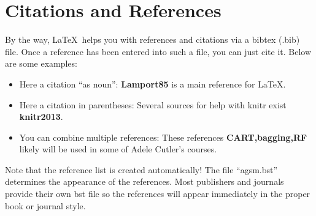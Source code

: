 \documentclass[12pt]{article}\usepackage[]{graphicx}\usepackage[]{xcolor}
\begin{document}
\section{Citations and References}

By the way, \LaTeX\ helps you with references and citations via
a bibtex (.bib) file. Once a reference has been entered into such a file,
you can just cite it. Below are some examples:

\begin{itemize}
\item Here a citation ``as noun'':
\textbf{Lamport85} is a main reference for \LaTeX.

\item Here a citation in parentheses:
Several sources for help with knitr exist \textbf{knitr2013}.

\item You can combine multiple references: These references
\textbf{CART,bagging,RF} likely will be used in some of Adele Cutler's courses.
\end{itemize}

Note that the reference list is created automatically! The file ``agsm.bst''
determines the appearance of the references. Most publishers and journals
provide their own bst file so the references will appear immediately
in the proper book or journal style.


%


%
\end{document}
